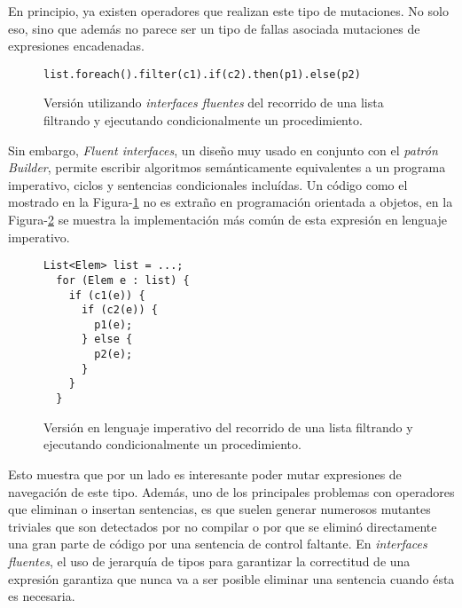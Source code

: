 En principio, ya existen operadores que realizan este tipo de mutaciones. No solo eso, sino que adem\'as no parece ser un tipo de fallas asociada mutaciones de expresiones encadenadas.

\begin{figure}
	\begin{lstlisting}[frame=single, mathescape=true,framexleftmargin=1.5em]
  list.foreach().filter(c1).if(c2).then(p1).else(p2)
	\end{lstlisting}
	\caption{Versi\'on utilizando \emph{interfaces fluentes} del recorrido de una lista filtrando y ejecutando condicionalmente un procedimiento.}
	\label{figures.examples.fluent.example1.fluent}
\end{figure}

Sin embargo, \emph{Fluent interfaces}, un dise\~no muy usado en conjunto con el \emph{patr\'on Builder}, permite escribir algoritmos sem\'anticamente equivalentes a un programa imperativo, ciclos y sentencias condicionales inclu\'idas. Un c\'odigo como el mostrado en la Figura-\ref{figures.examples.fluent.example1.fluent} no es extra\~no en programaci\'on orientada a objetos, en la Figura-\ref{figures.examples.fluent.example1.imperative} se muestra la implementaci\'on m\'as com\'un de esta expresi\'on en lenguaje imperativo.

\begin{figure}
	\begin{lstlisting}[frame=single, mathescape=true,framexleftmargin=1.5em]
  List<Elem> list = ...;
  for (Elem e : list) {
    if (c1(e)) {
      if (c2(e)) {
        p1(e);
      } else {
        p2(e);
      }
    }
  }
	\end{lstlisting}
	\caption{Versi\'on en lenguaje imperativo del recorrido de una lista filtrando y ejecutando condicionalmente un procedimiento.}
	\label{figures.examples.fluent.example1.imperative}
\end{figure}

Esto muestra que por un lado es interesante poder mutar expresiones de navegaci\'on de este tipo. Adem\'as, uno de los principales problemas con operadores que eliminan o insertan sentencias, es que suelen generar numerosos mutantes triviales que son detectados por no compilar o por que se elimin\'o directamente una gran parte de c\'odigo por una sentencia de control faltante. En \emph{interfaces fluentes}, el uso de jerarqu\'ia de tipos para garantizar la correctitud de una expresi\'on garantiza que nunca va a ser posible eliminar una sentencia cuando \'esta es necesaria.

